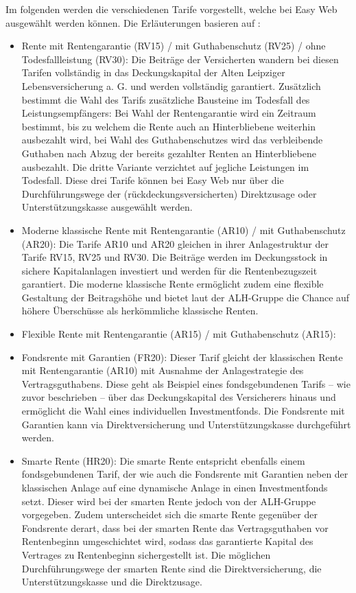 Im folgenden werden die verschiedenen Tarife vorgestellt, welche bei Easy Web ausgewählt werden können. Die Erläuterungen basieren auf \cite{alh_produkte}:
\begin{itemize}
\item Rente mit Rentengarantie (RV15) / mit Guthabenschutz (RV25) / ohne Todesfallleistung (RV30): Die Beiträge der Versicherten wandern bei diesen Tarifen vollständig in das Deckungskapital der Alten Leipziger Lebensversicherung a. G. und werden vollständig garantiert. Zusätzlich bestimmt die Wahl des Tarifs zusätzliche Bausteine im Todesfall des Leistungsempfängers: Bei Wahl der Rentengarantie wird ein Zeitraum bestimmt, bis zu welchem die Rente auch an Hinterbliebene weiterhin ausbezahlt wird, bei Wahl des Guthabenschutzes wird das verbleibende Guthaben nach Abzug der bereits gezahlter Renten an Hinterbliebene ausbezahlt. Die dritte Variante verzichtet auf jegliche Leistungen im Todesfall. Diese drei Tarife können bei Easy Web nur über die Durchführungswege der (rückdeckungsversicherten) Direktzusage oder Unterstützungskasse ausgewählt werden.

\item Moderne klassische Rente mit Rentengarantie (AR10) / mit Guthabenschutz (AR20): Die Tarife AR10 und AR20 gleichen in ihrer Anlagestruktur der Tarife RV15, RV25 und RV30. Die Beiträge werden im Deckungsstock in sichere Kapitalanlagen investiert und werden für die Rentenbezugszeit garantiert. Die moderne klassische Rente ermöglicht zudem eine flexible Gestaltung der Beitragshöhe und bietet laut der ALH-Gruppe \cite{alh_produkte} die Chance auf höhere Überschüsse als herkömmliche klassische Renten.
\item Flexible Rente mit Rentengarantie (AR15) / mit Guthabenschutz (AR15): 

\item Fondsrente mit Garantien (FR20): Dieser Tarif gleicht der klassischen Rente mit Rentengarantie (AR10) mit Ausnahme der Anlagestrategie des Vertragsguthabens. Diese geht als Beispiel eines fondsgebundenen Tarifs -- wie zuvor beschrieben -- über das Deckungskapital des Versicherers hinaus und ermöglicht die Wahl eines individuellen Investmentfonds. Die Fondsrente mit Garantien kann via Direktversicherung und Unterstützungskasse durchgeführt werden.
\item Smarte Rente (HR20): Die smarte Rente entspricht ebenfalls einem fondsgebundenen Tarif, der wie auch die Fondsrente mit Garantien neben der klassischen Anlage auf eine dynamische Anlage in einen Investmentfonds setzt. Dieser wird bei der smarten Rente jedoch von der ALH-Gruppe vorgegeben. Zudem unterscheidet sich die smarte Rente gegenüber der Fondsrente derart, dass bei der smarten Rente das Vertragsguthaben vor Rentenbeginn umgeschichtet wird, sodass das garantierte Kapital des Vertrages zu Rentenbeginn sichergestellt ist. Die möglichen Durchführungswege der smarten Rente sind die Direktversicherung, die Unterstützungskasse und die Direktzusage.
\end{itemize}

